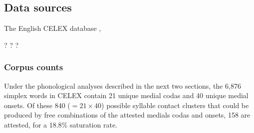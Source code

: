 \subsection{Data sources}

The English CELEX database \citep{CELEX},

\citet{Aronoff1976}

\citet{Harley2009}

\citet{Taft1975} ?
\citet{Taft1981} ?
\citet{Taft2004a} ?

\citet{Halle1962}


\subsubsection{Corpus counts}

Under the phonological analyses described in the next two sections, the 6,876 simplex words in CELEX contain 21 unique medial codas and 40 unique medial onsets. Of these 840 ($= 21 \times 40$) possible syllable contact clusters that could be produced by free combinations of the attested medials codas and onsets, 158 are attested, for a 18.8\% saturation rate.

